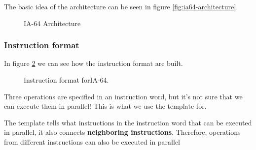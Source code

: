 The basic idea of the architecture can be seen in figure \ref{fig:ia64-architecture}
\begin{figure}[H]
  \centering
  \caption{IA-64 Architecture}
  \label{fig:ia64-instr-architecture}
\end{figure}


\subsubsection{Instruction format}
In figure \ref{fig:ia64-instr-format} we can see how the instruction format are built.

\begin{figure}[H]
  \centering
  \caption{Instruction format forIA-64.}
  \label{fig:ia64-instr-format}
\end{figure}

Three operations are specified in an instruction word, but it's not sure that we can execute them in parallel! This is what we use the template for.

The template tells what instructions in the instruction word that can be executed in parallel, it also connects \textbf{neighboring instructions}. Therefore,
operations from different instructions can also be executed in parallel

